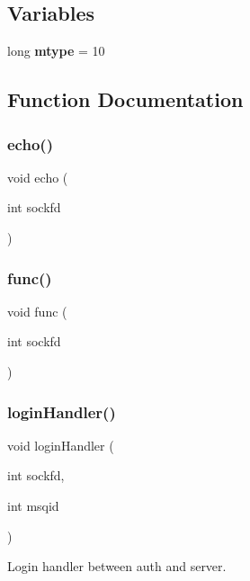 \subsection*{Variables}
\begin{DoxyCompactItemize}
\item 
long \textbf{ mtype} = 10
\end{DoxyCompactItemize}


\subsection{Function Documentation}
\mbox{\label{srv_8c_a0033423d840f5e71860d9e37b43d6fac}} 
\subsubsection{echo()}
{\footnotesize\ttfamily void echo (\begin{DoxyParamCaption}\item[{int}]{sockfd }\end{DoxyParamCaption})}

\mbox{\label{srv_8c_ac17020a38607ab29ce18939d5194a32a}} 
\subsubsection{func()}
{\footnotesize\ttfamily void func (\begin{DoxyParamCaption}\item[{int}]{sockfd }\end{DoxyParamCaption})}

\mbox{\label{srv_8c_a3c622a991710c831fbb1b5514d0699eb}} 
\subsubsection{login\+Handler()}
{\footnotesize\ttfamily void login\+Handler (\begin{DoxyParamCaption}\item[{int}]{sockfd,  }\item[{int}]{msqid }\end{DoxyParamCaption})}



Login handler between auth and server. 


